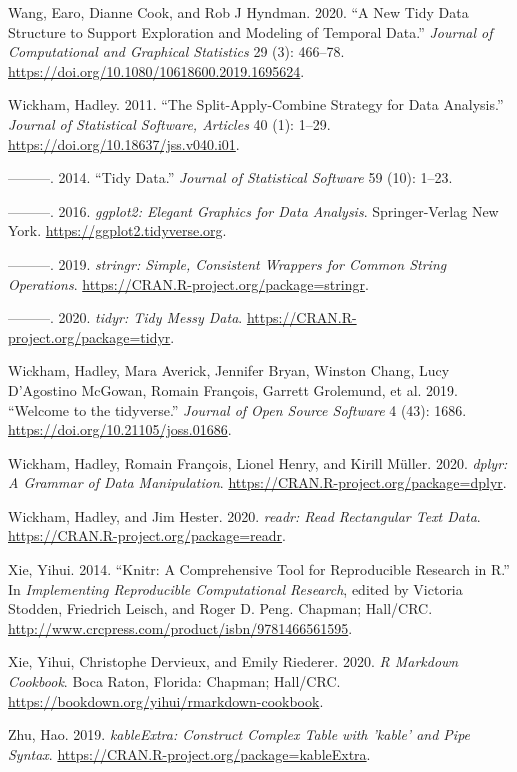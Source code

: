 \documentclass{article}
\newlength{\cslhangindent}
\newlength{\cslentryspacingunit} %
\newenvironment{CSLReferences}[2] %
 {%
  \setlength{\parindent}{0pt}
  \ifodd #1
  \let\oldpar\par
  \def\par{\hangindent=\cslhangindent\oldpar}
  \fi
  \setlength{\parskip}{#2\cslentryspacingunit}
 }%
 {}
\begin{document}
\begin{CSLReferences}{1}{0}
\leavevmode{}%
Wang, Earo, Dianne Cook, and Rob J Hyndman. 2020. {``A New Tidy Data Structure to Support Exploration and Modeling of Temporal Data.''} \emph{Journal of Computational and Graphical Statistics} 29 (3): 466--78. \url{https://doi.org/10.1080/10618600.2019.1695624}.

\leavevmode{}%
Wickham, Hadley. 2011. {``The Split-Apply-Combine Strategy for Data Analysis.''} \emph{Journal of Statistical Software, Articles} 40 (1): 1--29. \url{https://doi.org/10.18637/jss.v040.i01}.

\leavevmode{}%
---------. 2014. {``Tidy Data.''} \emph{Journal of Statistical Software} 59 (10): 1--23.

\leavevmode{}%
---------. 2016. \emph{{ggplot2: Elegant Graphics for Data Analysis}}. Springer-Verlag New York. \url{https://ggplot2.tidyverse.org}.

\leavevmode{}%
---------. 2019. \emph{{stringr: Simple, Consistent Wrappers for Common String Operations}}. \url{https://CRAN.R-project.org/package=stringr}.

\leavevmode{}%
---------. 2020. \emph{{tidyr: Tidy Messy Data}}. \url{https://CRAN.R-project.org/package=tidyr}.

\leavevmode{}%
Wickham, Hadley, Mara Averick, Jennifer Bryan, Winston Chang, Lucy D'Agostino McGowan, Romain François, Garrett Grolemund, et al. 2019. {``Welcome to the {tidyverse}.''} \emph{Journal of Open Source Software} 4 (43): 1686. \url{https://doi.org/10.21105/joss.01686}.

\leavevmode{}%
Wickham, Hadley, Romain François, Lionel Henry, and Kirill Müller. 2020. \emph{{dplyr: A Grammar of Data Manipulation}}. \url{https://CRAN.R-project.org/package=dplyr}.

\leavevmode{}%
Wickham, Hadley, and Jim Hester. 2020. \emph{{readr: Read Rectangular Text Data}}. \url{https://CRAN.R-project.org/package=readr}.

\leavevmode{}%
Xie, Yihui. 2014. {``Knitr: A Comprehensive Tool for Reproducible Research in {R}.''} In \emph{Implementing Reproducible Computational Research}, edited by Victoria Stodden, Friedrich Leisch, and Roger D. Peng. Chapman; Hall/CRC. \url{http://www.crcpress.com/product/isbn/9781466561595}.

\leavevmode{}%
Xie, Yihui, Christophe Dervieux, and Emily Riederer. 2020. \emph{R Markdown Cookbook}. Boca Raton, Florida: Chapman; Hall/CRC. \url{https://bookdown.org/yihui/rmarkdown-cookbook}.

\leavevmode{}%
Zhu, Hao. 2019. \emph{{kableExtra: Construct Complex Table with 'kable' and Pipe Syntax}}. \url{https://CRAN.R-project.org/package=kableExtra}.

\end{CSLReferences}



\end{document}

